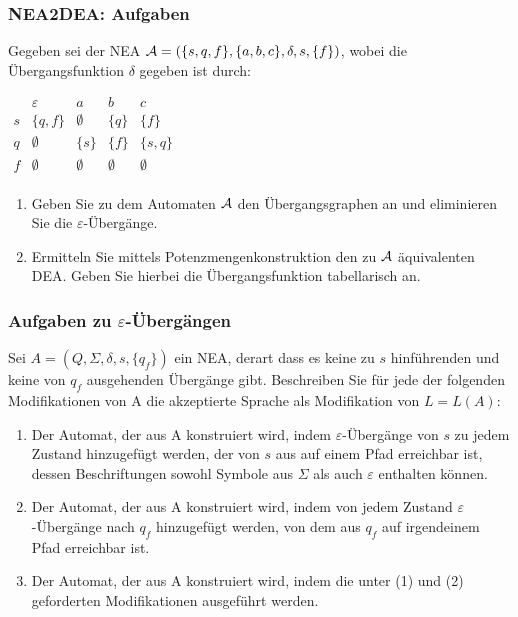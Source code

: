 \documentclass{beamer}
\begin{document}
{\begin{frame}
\end{frame}
\begin{frame}
	\frametitle{NEA2DEA: Aufgaben}
Gegeben sei der NEA ${\cal A}=(\{s,q,f\},\{a,b,c\},\delta,s,\{f\})$, wobei
die Übergangsfunktion $\delta$ gegeben ist durch:
\begin{center}
$\begin{array}{r|cccc}
&\varepsilon & a & b & c\\\hline
s & \{q,f\} & \emptyset & \{q\} &\{f\}\\
q &  \emptyset & \{s\} & \{f\} & \{s,q\}\\
f & \emptyset & \emptyset &  \emptyset &  \emptyset\\
\end{array}$
\end{center}
\begin{enumerate}
\item Geben Sie zu dem Automaten ${\cal A}$ den Übergangsgraphen an und eliminieren
Sie die $\varepsilon$-Übergänge.
\item Ermitteln Sie mittels Potenzmengenkonstruktion den zu ${\cal A}$ äquivalenten
DEA. Geben Sie hierbei die Übergangsfunktion tabellarisch an.
\end{enumerate}
\end{frame}
\begin{frame}	
\frametitle{Aufgaben zu \(\varepsilon\)-Übergängen}
Sei $A=(Q,\Sigma, \delta, s, \{q_f\})$ ein NEA, derart dass es keine zu $s$ hinführenden und keine von $q_f$ ausgehenden Übergänge gibt. Beschreiben Sie für jede der folgenden Modifikationen von A die akzeptierte Sprache als Modifikation von $L=L(A)$:
\begin{enumerate}
\item Der Automat, der aus A konstruiert wird, indem $\varepsilon$-Übergänge von $s$ zu jedem Zustand hinzugefügt werden, der von $s$ aus auf einem Pfad erreichbar ist, dessen Beschriftungen sowohl Symbole aus $\Sigma$ als auch $\varepsilon$ enthalten können.
\item Der Automat, der aus A konstruiert wird, indem von jedem Zustand $\varepsilon$-Übergänge nach $q_f$ hinzugefügt werden, von dem aus $q_f$ auf irgendeinem Pfad erreichbar ist.
\item Der Automat, der aus A konstruiert wird, indem die unter (1) und (2) geforderten Modifikationen ausgeführt werden.
\end{enumerate}

\end{frame}

}
\end{document}
